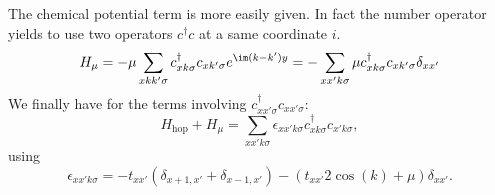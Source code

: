 \documentclass[../main.tex]{subfile}
\begin{document}
The chemical potential term is more easily given. In fact the number operator yields to use two operators $c^{\dagger}c$ at a same coordinate $i$.
\begin{equation}
    H_{\mu} = -\mu \sum_{x kk' \sigma} c_{x k\sigma}^{\dagger} c_{x k'\sigma} e^{\im (k-k')y} = -   \sum_{xx'k\sigma} \mu c_{xk\sigma}^{\dagger} c_{xk'\sigma} \delta_{xx'}     
\end{equation}
We finally have for the terms involving $c^{\dagger}_{xx'\sigma} c_{xx'\sigma}$:
\begin{equation*}
    H_{\text{hop}} + H_{\mu} = \sum_{xx'k\sigma} \epsilon_{xx'k\sigma} c_{xk\sigma}^{\dagger} c_{x'k\sigma},
\end{equation*}
using
\[
    \epsilon_{xx'k\sigma}= - t_{xx'} \left(\delta_{x+1, x'} + \delta_{x-1,x'}\right) - \left(t_{xx'}2\cos(k) + \mu\right) \delta_{xx'}.
\]
\end{document}
